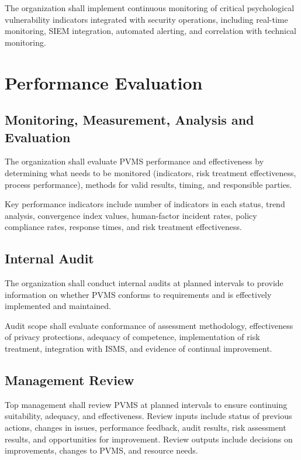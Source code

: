 \documentclass[11pt,a4paper]{article}
\begin{document}
The organization shall implement continuous monitoring of critical psychological vulnerability indicators integrated with security operations, including real-time monitoring, SIEM integration, automated alerting, and correlation with technical monitoring.

\section{Performance Evaluation}

\subsection{Monitoring, Measurement, Analysis and Evaluation}

The organization shall evaluate PVMS performance and effectiveness by determining what needs to be monitored (indicators, risk treatment effectiveness, process performance), methods for valid results, timing, and responsible parties.

Key performance indicators include number of indicators in each status, trend analysis, convergence index values, human-factor incident rates, policy compliance rates, response times, and risk treatment effectiveness.

\subsection{Internal Audit}

The organization shall conduct internal audits at planned intervals to provide information on whether PVMS conforms to requirements and is effectively implemented and maintained.

Audit scope shall evaluate conformance of assessment methodology, effectiveness of privacy protections, adequacy of competence, implementation of risk treatment, integration with ISMS, and evidence of continual improvement.

\subsection{Management Review}

Top management shall review PVMS at planned intervals to ensure continuing suitability, adequacy, and effectiveness. Review inputs include status of previous actions, changes in issues, performance feedback, audit results, risk assessment results, and opportunities for improvement. Review outputs include decisions on improvements, changes to PVMS, and resource needs.
\end{document}
